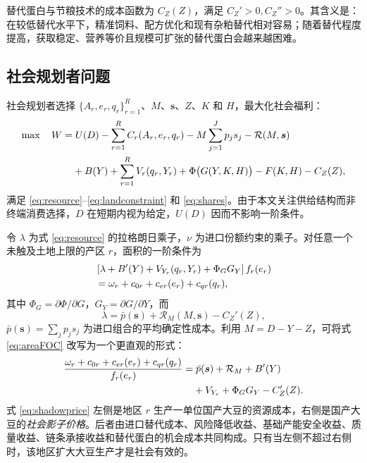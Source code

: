 \documentclass[UTF8,zihao=-4,fontset=fandol]{ctexart}
\numberwithin{equation}{section}
\theoremstyle{definition}
\theoremstyle{remark}
\begin{document}
替代蛋白与节粮技术的成本函数为 $C_Z(Z)$，满足 $C_Z'>0,C_Z''>0$。其含义是：在较低替代水平下，精准饲料、配方优化和现有杂粕替代相对容易；随着替代程度提高，获取稳定、营养等价且规模可扩张的替代蛋白会越来越困难。

\subsection{社会规划者问题}

社会规划者选择 $\{A_r,e_r,q_r\}_{r=1}^{R}$、$M$、$\bm s$、$Z$、$K$ 和 $H$，最大化社会福利：
\begin{align}
 \max \quad W=&\;U(D)-\sum_{r=1}^{R}C_r(A_r,e_r,q_r)-M\sum_{j=1}^{J}p_js_j-\mathcal{R}(M,\bm s) \notag\\
 &+B(Y)+\sum_{r=1}^{R}V_r(q_r,Y_r)+\Phi\big(G(Y,K,H)\big)-F(K,H)-C_Z(Z),
 \label{eq:planner}
\end{align}
满足 \eqref{eq:resource}--\eqref{eq:landconstraint} 和 \eqref{eq:shares}。由于本文关注供给结构而非终端消费选择，$D$ 在短期内视为给定，$U(D)$ 因而不影响一阶条件。

令 $\lambda$ 为式 \eqref{eq:resource} 的拉格朗日乘子，$\nu$ 为进口份额约束的乘子。对任意一个未触及土地上限的产区 $r$，面积的一阶条件为
\begin{align}
 &\left[\lambda+B'(Y)+V_{Y_r}(q_r,Y_r)+\Phi_GG_Y\right]f_r(e_r) \notag\\
 &=\omega_r+c_{0r}+c_{er}(e_r)+c_{qr}(q_r),
 \label{eq:areaFOC}
\end{align}
其中 $\Phi_G=\partial\Phi/\partial G$，$G_Y=\partial G/\partial Y$，而
\begin{equation}
 \lambda=\bar p(\bm s)+\mathcal{R}_M(M,\bm s)-C_Z'(Z),
 \label{eq:lambda}
\end{equation}
$\bar p(\bm s)=\sum_jp_js_j$ 为进口组合的平均确定性成本。利用 $M=D-Y-Z$，可将式 \eqref{eq:areaFOC} 改写为一个更直观的形式：
\begin{align}
 \frac{\omega_r+c_{0r}+c_{er}(e_r)+c_{qr}(q_r)}{f_r(e_r)}
 =&\;\bar p(\bm s)+\mathcal{R}_M+B'(Y) \notag\\
 &+V_{Y_r}+\Phi_GG_Y-C_Z'(Z).
 \label{eq:shadowprice}
\end{align}
式 \eqref{eq:shadowprice} 左侧是地区 $r$ 生产一单位国产大豆的资源成本，右侧是国产大豆的\emph{社会影子价格}。后者由进口替代成本、风险降低收益、基础产能安全收益、质量收益、链条承接收益和替代蛋白的机会成本共同构成。只有当左侧不超过右侧时，该地区扩大大豆生产才是社会有效的。
\end{document}
